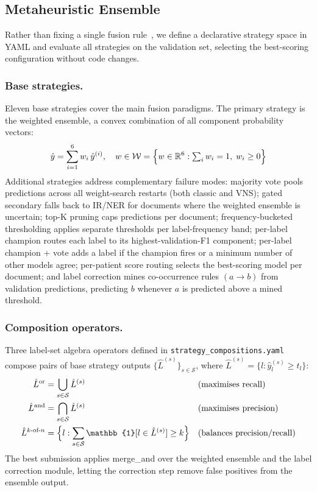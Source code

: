 \subsection{Metaheuristic Ensemble}
\label{subsec:ensemble}

Rather than fixing a single fusion rule~\cite{dietterich2000ensemble}, we define a
declarative strategy space in YAML and evaluate all strategies on the validation set,
selecting the best-scoring configuration without code changes.

\subsubsection{Base strategies.}
Eleven base strategies cover the main fusion paradigms. The primary strategy is the
weighted ensemble, a convex combination of all component probability vectors:
\begin{equation}
\hat{y} = \sum_{i=1}^{6} w_i\,\hat{y}^{(i)}, \quad w \in \mathcal{W} = \Bigl\{w \in \mathbb{R}^6 : \textstyle\sum_i w_i = 1,\; w_i \geq 0\Bigr\}
\end{equation}
Additional strategies address complementary failure modes: majority vote pools predictions
across all weight-search restarts (both classic and VNS); gated secondary falls back to
IR/NER for documents where the weighted ensemble is uncertain; top-K pruning caps
predictions per document; frequency-bucketed thresholding applies separate thresholds
per label-frequency band; per-label champion routes each label to its highest-validation-F1
component; per-label champion + vote adds a label if the champion fires or a minimum
number of other models agree; per-patient score routing selects the best-scoring model
per document; and label correction mines co-occurrence rules $(a \!\to\! b)$ from
validation predictions, predicting $b$ whenever $a$ is predicted above a mined threshold.

\subsubsection{Composition operators.}
Three label-set algebra operators defined in \texttt{strategy\_compositions.yaml} compose
pairs of base strategy outputs $\{\hat{L}^{(s)}\}_{s \in \mathcal{S}}$, where
$\hat{L}^{(s)} = \{l : \hat{y}_l^{(s)} \geq t_l\}$:
\begin{align}
\hat{L}^{\text{or}}  &= \bigcup_{s \in \mathcal{S}} \hat{L}^{(s)}
  & &\text{(maximises recall)} \\
\hat{L}^{\text{and}} &= \bigcap_{s \in \mathcal{S}} \hat{L}^{(s)}
  & &\text{(maximises precision)} \\
\hat{L}^{k\text{-of-}n} &= \Bigl\{l : \sum_{s \in \mathcal{S}} \mathbb{1}[l \in \hat{L}^{(s)}] \geq k\Bigr\}
  & &\text{(balances precision/recall)}
\end{align}
The best submission applies merge\_and over the weighted ensemble and the label
correction module, letting the correction step remove false positives from the
ensemble output.

